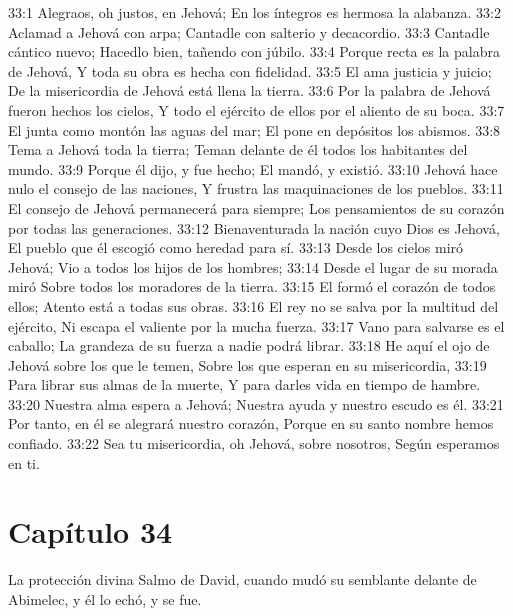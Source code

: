 33:1 Alegraos, oh justos, en Jehová; 
En los íntegros es hermosa la alabanza. 
33:2 Aclamad a Jehová con arpa; 
Cantadle con salterio y decacordio. 
33:3 Cantadle cántico nuevo; 
Hacedlo bien, tañendo con júbilo. 
33:4 Porque recta es la palabra de Jehová, 
Y toda su obra es hecha con fidelidad. 
33:5 El ama justicia y juicio; 
De la misericordia de Jehová está llena la tierra. 
33:6 Por la palabra de Jehová fueron hechos los cielos, 
Y todo el ejército de ellos por el aliento de su boca. 
33:7 El junta como montón las aguas del mar; 
El pone en depósitos los abismos. 
33:8 Tema a Jehová toda la tierra; 
Teman delante de él todos los habitantes del mundo. 
33:9 Porque él dijo, y fue hecho; 
El mandó, y existió. 
33:10 Jehová hace nulo el consejo de las naciones, 
Y frustra las maquinaciones de los pueblos. 
33:11 El consejo de Jehová permanecerá para siempre; 
Los pensamientos de su corazón por todas las generaciones. 
33:12 Bienaventurada la nación cuyo Dios es Jehová, 
El pueblo que él escogió como heredad para sí. 
33:13 Desde los cielos miró Jehová; 
Vio a todos los hijos de los hombres; 
33:14 Desde el lugar de su morada miró 
Sobre todos los moradores de la tierra. 
33:15 El formó el corazón de todos ellos; 
Atento está a todas sus obras. 
33:16 El rey no se salva por la multitud del ejército, 
Ni escapa el valiente por la mucha fuerza. 
33:17 Vano para salvarse es el caballo; 
La grandeza de su fuerza a nadie podrá librar. 
33:18 He aquí el ojo de Jehová sobre los que le temen, 
Sobre los que esperan en su misericordia, 
33:19 Para librar sus almas de la muerte, 
Y para darles vida en tiempo de hambre. 
33:20 Nuestra alma espera a Jehová; 
Nuestra ayuda y nuestro escudo es él. 
33:21 Por tanto, en él se alegrará nuestro corazón, 
Porque en su santo nombre hemos confiado. 
33:22 Sea tu misericordia, oh Jehová, sobre nosotros, 
Según esperamos en ti. 
\section*{Capítulo 34}
La protección divina 
Salmo de David, cuando mudó su semblante delante de Abimelec,  y él lo echó, y se fue. 
 
